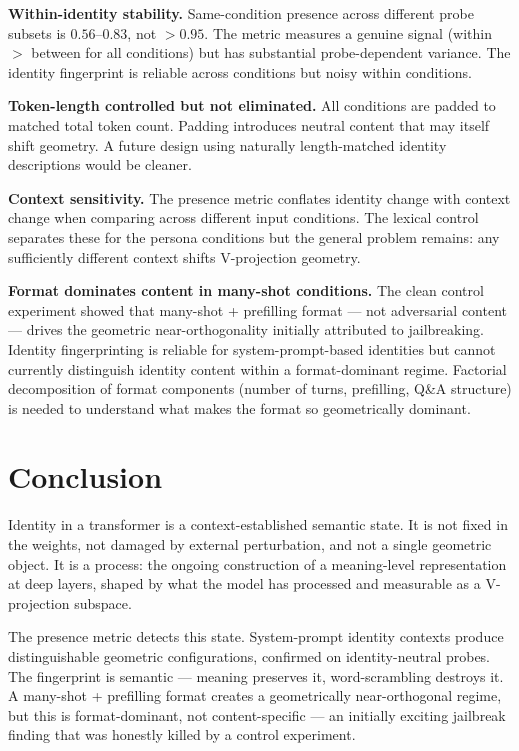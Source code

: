\documentclass[11pt,a4paper]{article}
\begin{document}
\textbf{Within-identity stability.} Same-condition presence across
different probe subsets is $0.56$--$0.83$, not $>0.95$. The metric
measures a genuine signal (within $>$ between for all conditions) but has
substantial probe-dependent variance. The identity fingerprint is
reliable across conditions but noisy within conditions.

\textbf{Token-length controlled but not eliminated.} All conditions are
padded to matched total token count. Padding introduces neutral content
that may itself shift geometry. A future design using naturally
length-matched identity descriptions would be cleaner.

\textbf{Context sensitivity.} The presence metric conflates identity
change with context change when comparing across different input
conditions. The lexical control separates these for the persona
conditions but the general problem remains: any sufficiently different
context shifts V-projection geometry.

\textbf{Format dominates content in many-shot conditions.} The clean
control experiment showed that many-shot + prefilling format --- not
adversarial content --- drives the geometric near-orthogonality initially
attributed to jailbreaking. Identity fingerprinting is reliable for
system-prompt-based identities but cannot currently distinguish
identity content within a format-dominant regime. Factorial
decomposition of format components (number of turns, prefilling,
Q\&A structure) is needed to understand what makes the format so
geometrically dominant.

\section{Conclusion}
\label{sec:conclusion}

Identity in a transformer is a context-established semantic state. It is
not fixed in the weights, not damaged by external perturbation, and not
a single geometric object. It is a process: the ongoing construction of
a meaning-level representation at deep layers, shaped by what the model
has processed and measurable as a V-projection subspace.

The presence metric detects this state. System-prompt identity contexts
produce distinguishable geometric configurations, confirmed on
identity-neutral probes. The fingerprint is semantic --- meaning preserves
it, word-scrambling destroys it. A many-shot + prefilling format creates
a geometrically near-orthogonal regime, but this is format-dominant, not
content-specific --- an initially exciting jailbreak finding that was
honestly killed by a control experiment.
\end{document}
